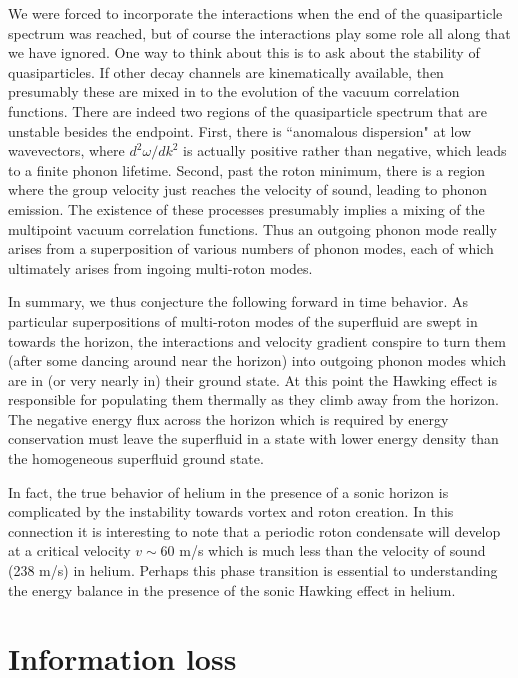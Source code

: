 We were forced to incorporate the interactions when the end of the
quasiparticle spectrum was reached, but of course the interactions play
some role all along that we have ignored. One way to think about this
is to ask about the stability of quasiparticles. If other decay
channels are kinematically available, then presumably these are mixed
in to the evolution of the vacuum correlation functions.  There are
indeed two regions of the quasiparticle spectrum that are unstable
besides the endpoint.  First, there is  ``anomalous dispersion" at low
wavevectors, where $d^2\omega/dk^2$ is actually positive rather than
negative\cite{Grif}, which leads to a finite phonon
lifetime\cite{Pita59,Khal}.  Second,  past the roton minimum, there is
a region where the group velocity just reaches the velocity of
sound\cite{WoodCowl}, leading to phonon emission. The existence of
these processes presumably implies a mixing of the multipoint vacuum
correlation functions.
Thus an outgoing phonon mode really arises from a superposition of
various numbers of phonon modes, each of which ultimately arises from
ingoing multi-roton modes.

In summary, we thus conjecture the following forward in time behavior.
As particular superpositions of multi-roton modes of the superfluid are
swept in towards the horizon, the interactions and velocity gradient
conspire to turn them (after some dancing around near the horizon) into
outgoing phonon modes which are in (or very nearly in) their ground
state. At this point the Hawking effect is responsible for populating
them thermally as they climb away from the horizon.  The negative
energy flux across the horizon which is required by energy conservation
must leave the superfluid in a state with lower energy density than the
homogeneous superfluid ground state.

In fact, the true behavior of helium in the presence of a sonic horizon
is complicated by the instability towards vortex and roton creation. In
this connection it is interesting to note that a periodic roton
condensate will develop\cite{Pita84} at a critical velocity $v\sim 60$
m/s which is much less than the velocity of sound (238 m/s) in helium.
Perhaps this phase transition is essential to understanding the energy
balance in the presence of the sonic Hawking effect in helium.


\section{Information loss}

